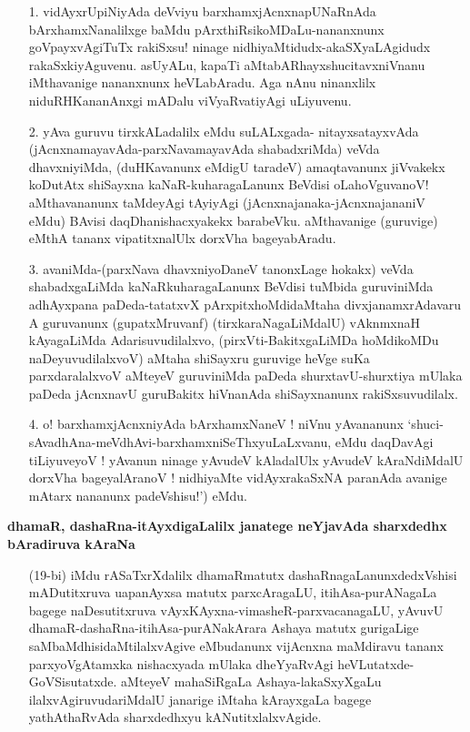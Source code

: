 \begin{itemize}
\item[1.] vidAyxrUpiNiyAda deVviyu barxhamxjAcnxnapUNaRnAda bArxhamxNanalilxge baMdu pArxthiRsikoMDaLu-nananxnunx goVpayxvAgiTuTx rakiSxsu! ninage nidhiyaMtidudx-akaSXyaLAgidudx rakaSxkiyAguvenu. asUyALu, kapaTi aMtabARhayxshucitavxniVnanu iMthavanige nananxnunx heVLabAradu. Aga nAnu ninanxlilx niduRHKananAnxgi mADalu viVyaRvatiyAgi uLiyuvenu.

\item[2.] yAva guruvu tirxkALadalilx eMdu suLALxgada- nitayxsatayxvAda (jAcnxnamayavAda-parxNavamayavAda shabadxriMda) veVda dhavxniyiMda, (duHKavanunx eMdigU taradeV) amaqtavanunx jiVvakekx koDutAtx shiSayxna kaNaR-kuharagaLanunx BeVdisi oLahoVguvanoV! aMthavananunx taMdeyAgi tAyiyAgi (jAcnxnajanaka-jAcnxnajananiV eMdu) BAvisi daqDhanishacxyakekx barabeVku. aMthavanige (guruvige) eMthA tananx vipatitxnalUlx dorxVha bageyabAradu.

\item[3.] avaniMda-(parxNava dhavxniyoDaneV tanonxLage hokakx) veVda shabadxgaLiMda kaNaRkuharagaLanunx BeVdisi tuMbida guruviniMda adhAyxpana paDeda-tatatxvX pArxpitxhoMdidaMtaha divxjanamxrAdavaru A guruvanunx (gupatxMruvanf) (tirxkaraNagaLiMdalU) vAknmxnaH kAyagaLiMda Adarisuvudilalxvo, (pirxVti-BakitxgaLiMDa hoMdikoMDu naDeyuvudilalxvoV) aMtaha shiSayxru guruvige heVge suKa parxdaralalxvoV aMteyeV guruviniMda paDeda shurxtavU-shurxtiya mUlaka paDeda jAcnxnavU guruBakitx hiVnanAda shiSayxnanunx rakiSxsuvudilalx.

\item[4.] o! barxhamxjAcnxniyAda bArxhamxNaneV ! niVnu yAvananunx `shuci-sAvadhAna-meVdhAvi-barxhamxniSeThxyuLaLxvanu, eMdu daqDavAgi tiLiyuveyoV ! yAvanun ninage yAvudeV kAladalUlx yAvudeV kAraNdiMdalU dorxVha bageyalAranoV ! nidhiyaMte vidAyxrakaSxNA paranAda avanige mAtarx nananunx padeVshisu!') eMdu.
\end{itemize}

\noindent
\textbf{dhamaR, dashaRna-itAyxdigaLalilx janatege neYjavAda sharxdedhx bAradiruva kAraNa}\label{page50}

\begin{itemize}
\item[(19-bi)] iMdu rASaTxrXdalilx dhamaRmatutx dashaRnagaLanunxdedxVshisi mADutitxruva uapanAyxsa matutx parxcAragaLU, itihAsa-purANagaLa bagege naDesutitxruva vAyxKAyxna-vimasheR-parxvacanagaLU, yAvuvU dhamaR-dashaRna-itihAsa-purANakArara Ashaya matutx gurigaLige saMbaMdhisidaMtilalxvAgive eMbudanunx vijAcnxna maMdiravu tananx parxyoVgAtamxka nishacxyada mUlaka dheYyaRvAgi heVLutatxde-GoVSisutatxde. aMteyeV mahaSiRgaLa Ashaya-lakaSxyXgaLu ilalxvAgiruvudariMdalU janarige iMtaha kArayxgaLa bagege yathAthaRvAda sharxdedhxyu kANutitxlalxvAgide.
\end{itemize}

